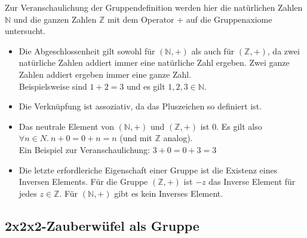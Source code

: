 \documentclass[12pt,a4paper, usenames, dvipsnames]{article}
\begin{document}
Zur Veranschaulichung der Gruppendefinition werden hier die natürlichen Zahlen $\mathbb{N}$ und die ganzen Zahlen $\mathbb{Z}$ mit dem Operator $+$ auf die Gruppenaxiome untersucht.
\begin{itemize}
\item Die Abgeschlossenheit gilt sowohl für $(\mathbb{N},+)$ als auch für $(\mathbb{Z},+)$, da zwei natürliche Zahlen addiert immer eine natürliche Zahl ergeben. Zwei ganze Zahlen addiert ergeben immer eine ganze Zahl. \\
Beispielsweise sind $1+2=3$ und es gilt $1,2,3 \in \mathbb{N}$.
\item Die Verknüpfung ist assoziativ, da das Pluszeichen so definiert ist.
\item Das neutrale Element von $(\mathbb{N},+)$ und $(\mathbb{Z},+)$ ist $0$. Es gilt also $\forall n \in N. \ n + 0 = 0 + n = n$ (und mit $\mathbb{Z}$ analog). \\
Ein Beispiel zur Veranschaulichung: $3+0=0+3=3$
\item Die letzte erfordleriche Eigenschaft einer Gruppe ist die Existenz eines Inversen Elements. Für die Gruppe $(\mathbb{Z},+)$ ist $-z$ das Inverse Element für jedes $z \in \mathbb{Z}$. Für $(\mathbb{N},+)$ gibt es kein Inverses Element.
\end{itemize}




 
















\subsection*{2x2x2-Zauberwüfel als Gruppe} 
\end{document}

